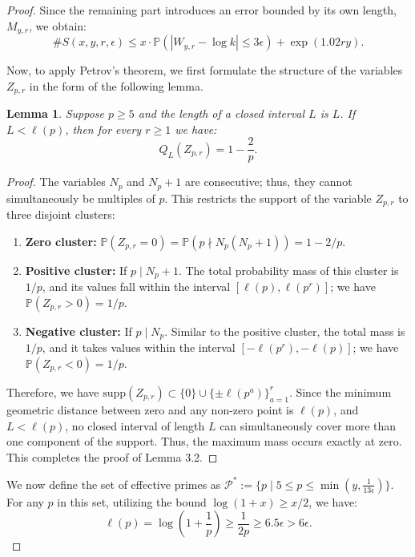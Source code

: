 \documentclass[12pt, a4paper]{article}
\theoremstyle{plain}
\newtheorem{lemma}[theorem]{Lemma}
\theoremstyle{definition}
\begin{document}
\begin{proof}
Since the remaining part introduces an error bounded by its own length, $M_{y,r}$, we obtain:
\begin{equation}
\text{\#}S(x, y, r, \epsilon) \leq x \cdot \mathbb{P}(|W_{y,r} - \log k| \leq 3\epsilon) + \exp(1.02ry). \label{eq:2}
\end{equation}

Now, to apply Petrov's theorem, we first formulate the structure of the variables $Z_{p,r}$ in the form of the following lemma.

\begin{lemma}
Suppose $p \geq 5$ and the length of a closed interval $L$ is $L$. If $L < \ell(p)$, then for every $r \geq 1$ we have:
\[ Q_L(Z_{p,r}) = 1 - \frac{2}{p}. \]
\end{lemma}

\begin{proof}
The variables $N_p$ and $N_p + 1$ are consecutive; thus, they cannot simultaneously be multiples of $p$. This restricts the support of the variable $Z_{p,r}$ to three disjoint clusters:
\begin{enumerate}
    \item \textbf{Zero cluster:} $\mathbb{P}(Z_{p,r} = 0) = \mathbb{P}(p \nmid N_p(N_p + 1)) = 1 - 2/p$.
    \item \textbf{Positive cluster:} If $p \mid N_p + 1$. The total probability mass of this cluster is $1/p$, and its values fall within the interval $[\ell(p), \ell(p^r)]$; we have $\mathbb{P}(Z_{p,r} > 0) = 1/p$.
    \item \textbf{Negative cluster:} If $p \mid N_p$. Similar to the positive cluster, the total mass is $1/p$, and it takes values within the interval $[-\ell(p^r), -\ell(p)]$; we have $\mathbb{P}(Z_{p,r} < 0) = 1/p$.
\end{enumerate}

Therefore, we have $\text{supp}(Z_{p,r}) \subset \{0\} \cup \{\pm \ell(p^a)\}_{a=1}^r$. Since the minimum geometric distance between zero and any non-zero point is $\ell(p)$, and $L < \ell(p)$, no closed interval of length $L$ can simultaneously cover more than one component of the support. Thus, the maximum mass occurs exactly at zero. This completes the proof of Lemma 3.2.
\end{proof}

We now define the set of effective primes as $\mathcal{P}^* := \{p \mid 5 \leq p \leq \min(y, \frac{1}{13\epsilon})\}$. For any $p$ in this set, utilizing the bound $\log(1 + x) \geq x/2$, we have:
\[ \ell(p) = \log \left(1 + \frac{1}{p}\right) \geq \frac{1}{2p} \geq 6.5\epsilon > 6\epsilon. \]


\end{proof}
\end{document}
